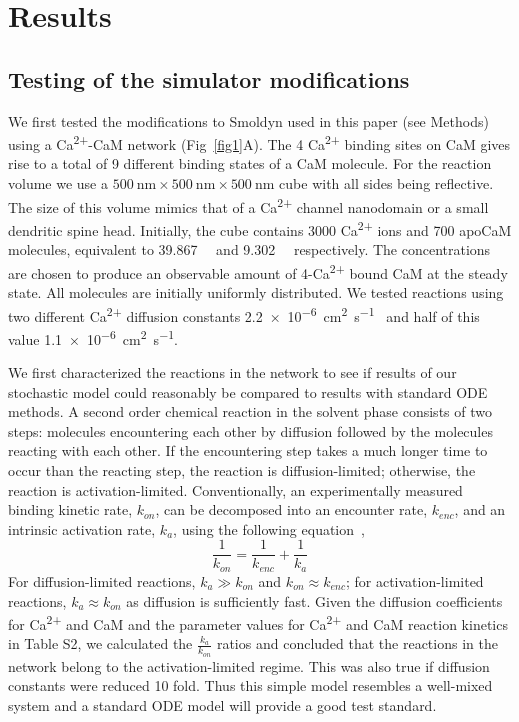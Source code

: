 \documentclass[10pt,letterpaper]{article}
\begin{document}
\section*{Results}
\subsection*{Testing of the simulator modifications}
We first tested the modifications to Smoldyn used in this paper (see Methods) using a Ca\textsuperscript{2+}-CaM network (Fig~\ref{fig1}A). The 4 Ca\textsuperscript{2+} binding sites on CaM gives rise to a total of 9 different binding states of a CaM molecule. For the reaction volume we use a $\SI{500}{\nm}\times\SI{500}{\nm}\times\SI{500}{\nm}$ cube with all sides being reflective. The size of this volume mimics that of a Ca\textsuperscript{2+} channel nanodomain or a small dendritic spine head. Initially, the cube contains 3000 Ca\textsuperscript{2+} ions and 700 apoCaM molecules, equivalent to \SI{39.867}{\micro\Molar} and 9.302\SI{}{\micro\Molar} respectively. The concentrations are chosen to produce an observable amount of 4-Ca\textsuperscript{2+} bound CaM at the steady state. All molecules are initially uniformly distributed. We tested reactions using two different Ca\textsuperscript{2+} diffusion constants \SI{2.2e-6}{\square\cm\per\s}~\cite{Keller:2008ez} and half of this value \SI{1.1e-6}{\square\cm\per\s}.

We first characterized the reactions in the network to see if results of our stochastic model could reasonably be compared to results with standard ODE methods. A second order chemical reaction in the solvent phase consists of two steps: molecules encountering each other by diffusion followed by the molecules reacting with each other. If the encountering step takes a much longer time to occur than the reacting step, the reaction is diffusion-limited; otherwise, the reaction is activation-limited. Conventionally, an experimentally measured binding kinetic rate, $k_{on}$, can be decomposed into an encounter rate, $k_{enc}$, and an intrinsic activation rate, $k_{a}$, using the following equation~\cite{Bamford198505},
\begin{equation}\frac{1}{k_{on}}=\frac{1}{k_{enc}}+\frac{1}{k_a}\end{equation}
For diffusion-limited reactions, $k_a \gg k_{on}$ and $k_{on} \approx k_{enc}$; for activation-limited reactions, $k_a \approx k_{on}$ as diffusion is sufficiently fast. Given the diffusion coefficients for Ca\textsuperscript{2+} and CaM and the parameter values for Ca\textsuperscript{2+} and CaM reaction kinetics in Table S2, we calculated the $\frac{k_a}{k_{on}}$ ratios and concluded that the reactions in the network belong to the activation-limited regime. This was also true if diffusion constants were reduced 10 fold. Thus this simple model resembles a well-mixed system and a standard ODE model will provide a good test standard. 
\end{document}
